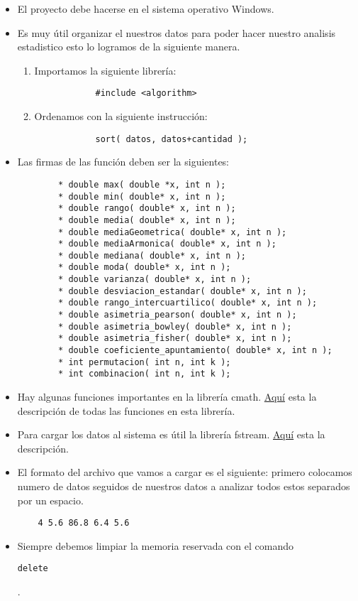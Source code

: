 \documentclass[10pt,a4paper]{article}
\begin{document}
\begin{itemize}
	\item El proyecto debe hacerse en el sistema operativo Windows.
	\item Es muy útil organizar el nuestros datos para poder hacer nuestro analisis estadistico esto lo logramos de la siguiente manera.
	\begin{enumerate}
		\item Importamos la siguiente librería:
			\begin{verbatim}
			#include <algorithm> 
			\end{verbatim}
		\item Ordenamos con la siguiente instrucción:
			\begin{verbatim}
			sort( datos, datos+cantidad );
			\end{verbatim}
	\end{enumerate}
	\item Las firmas de las función deben ser la siguientes:
	\begin{verbatim} 
		* double max( double *x, int n );
		* double min( double* x, int n );
		* double rango( double* x, int n );
		* double media( double* x, int n );
		* double mediaGeometrica( double* x, int n );
		* double mediaArmonica( double* x, int n );
		* double mediana( double* x, int n );
		* double moda( double* x, int n );
		* double varianza( double* x, int n );
		* double desviacion_estandar( double* x, int n );
		* double rango_intercuartilico( double* x, int n );
		* double asimetria_pearson( double* x, int n );
		* double asimetria_bowley( double* x, int n );
		* double asimetria_fisher( double* x, int n );
		* double coeficiente_apuntamiento( double* x, int n );
		* int permutacion( int n, int k );
		* int combinacion( int n, int k );
	\end{verbatim}
	
	\item Hay algunas funciones importantes en la librería cmath. \href{http://www.cplusplus.com/reference/cmath/}{Aquí}
	 esta la descripción de todas las funciones en esta librería.

	\item Para cargar los datos al sistema es útil la librería fstream. \href{http://www.cplusplus.com/reference/fstream/}{Aquí}
	esta la descripción.
	\item El formato del archivo que vamos a cargar es el siguiente: primero colocamos numero de datos seguidos de nuestros datos a analizar todos estos separados por un espacio.
	\begin{flushleft}
	\end{flushleft}
	\begin{verbatim}
	4 5.6 86.8 6.4 5.6
	\end{verbatim}
	\item Siempre debemos limpiar la memoria reservada con el comando \begin{verbatim}delete\end{verbatim}.
\end{itemize}
	
\end{document}
